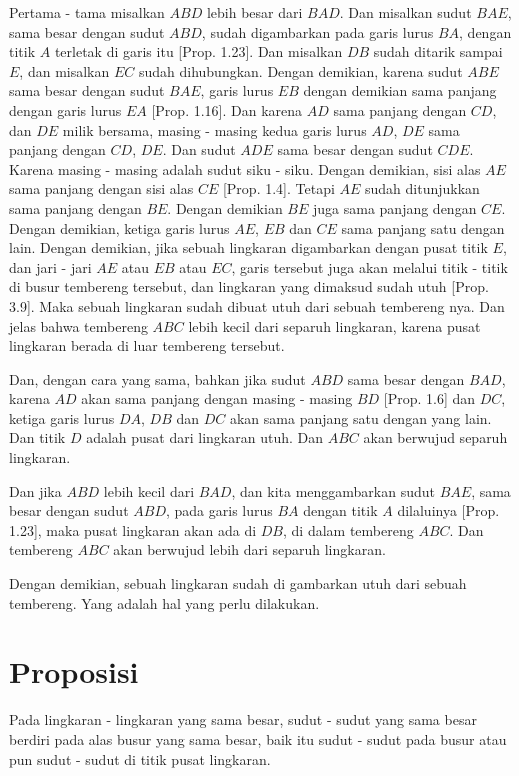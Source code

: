 \documentclass[a4paper]{book}
\begin{document}
Pertama - tama misalkan $ABD$ lebih besar dari $BAD$. Dan misalkan sudut 
$BAE$, sama besar dengan sudut $ABD$, sudah digambarkan pada garis lurus
$BA$, dengan titik $A$ terletak di garis itu [Prop. 1.23]. Dan misalkan
$DB$ sudah ditarik sampai $E$, dan misalkan $EC$ sudah dihubungkan. Dengan
demikian, karena sudut $ABE$ sama besar dengan sudut $BAE$, garis lurus $EB$
dengan demikian sama panjang dengan garis lurus $EA$ [Prop. 1.16]. Dan karena
$AD$ sama panjang dengan $CD$, dan $DE$ milik bersama, masing - masing kedua garis 
lurus $AD$, $DE$ sama panjang dengan $CD$, $DE$. Dan sudut $ADE$ sama besar
dengan sudut $CDE$. Karena masing - masing adalah sudut siku - siku. Dengan
demikian, sisi alas $AE$ sama panjang dengan sisi alas $CE$ [Prop. 1.4]. 
Tetapi $AE$ sudah ditunjukkan sama panjang dengan $BE$. Dengan demikian $BE$
juga sama panjang dengan $CE$. Dengan demikian, ketiga garis lurus $AE$, $EB$
dan $CE$ sama panjang satu dengan lain. Dengan demikian, jika sebuah lingkaran
digambarkan dengan pusat titik $E$, dan jari - jari  $AE$ atau $EB$ atau $EC$,
garis tersebut juga akan melalui titik - titik di busur tembereng tersebut, 
dan lingkaran yang dimaksud sudah utuh [Prop. 3.9]. Maka sebuah lingkaran
sudah dibuat utuh dari sebuah tembereng nya. Dan jelas bahwa tembereng $ABC$
lebih kecil dari separuh lingkaran, karena pusat lingkaran berada di luar
tembereng tersebut.

Dan, dengan cara yang sama, bahkan jika sudut $ABD$ sama besar dengan $BAD$,
karena $AD$ akan sama panjang dengan masing - masing $BD$ [Prop. 1.6] dan $DC$,
ketiga garis lurus $DA$, $DB$ dan $DC$ akan sama panjang satu dengan yang lain.
Dan titik $D$ adalah pusat dari lingkaran utuh. Dan $ABC$ akan berwujud separuh
lingkaran.

Dan jika $ABD$ lebih kecil dari $BAD$, dan kita menggambarkan sudut $BAE$, sama
besar dengan sudut $ABD$, pada garis lurus $BA$ dengan titik $A$ dilaluinya
[Prop. 1.23], maka pusat lingkaran akan ada di $DB$, di dalam tembereng $ABC$.
Dan tembereng $ABC$ akan berwujud lebih dari separuh lingkaran.

Dengan demikian, sebuah lingkaran sudah di gambarkan utuh dari sebuah tembereng.
Yang adalah hal yang perlu dilakukan.

\section*{\centering Proposisi \thesection}
Pada lingkaran - lingkaran yang sama besar, sudut - sudut yang sama besar 
berdiri pada alas busur yang sama besar, baik itu sudut - sudut pada busur atau pun 
sudut - sudut di titik pusat lingkaran.
\end{document}
